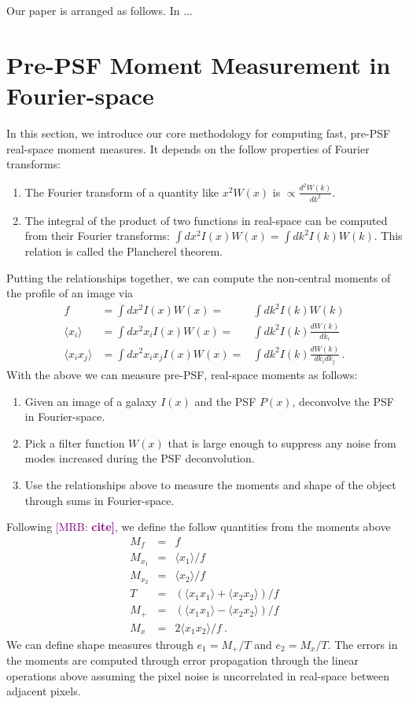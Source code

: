 \documentclass[twocolappendix, appendixfloats, numberedappendix, twocolumn, apj]{openjournal}
\newcommand{\mrb}[1]{\textcolor{purple}{[MRB: \bf #1]}\xspace}
\begin{document}
Our paper is arranged as follows. In ...

\section{Pre-PSF Moment Measurement in Fourier-space}

In this section, we introduce our core methodology for computing fast, pre-PSF real-space moment
measures. It depends on the follow properties of Fourier transforms:
\begin{enumerate}
\item The Fourier transform of a quantity like $x^2W(x)$ is $\propto\frac{d^{2}W(k)}{dk^2}$.
\item The integral of the product of two functions in real-space can be computed from their Fourier
      transforms: $\int dx^2 I(x)W(x) = \int dk^2 I(k)W(k)$. This relation is called the Plancherel theorem.
\end{enumerate}
Putting the relationships together, we can compute the non-central moments of the profile of
an image via
\begin{eqnarray}
f                          & = \int dx^2 I(x)W(x) =            & \int dk^2 I(k)W(k) \\
\langle x_{i} \rangle      & = \int dx^2 x_{i} I(x)W(x) =      & \int dk^2 I(k)\frac{dW(k)}{dk_i} \\
\langle x_{i}x_{j} \rangle & = \int dx^2 x_{i}x_{j} I(x)W(x) = & \int dk^2 I(k)\frac{dW(k)}{dk_{i}dk_{j}}\,.
\end{eqnarray}
With the above we can measure pre-PSF, real-space moments as follows:
\begin{enumerate}
\item Given an image of a galaxy $I(x)$ and the PSF $P(x)$, deconvolve the PSF in Fourier-space.
\item Pick a filter function $W(x)$ that is large enough to suppress any noise from modes increased
      during the PSF deconvolution.
\item Use the relationships above to measure the moments and shape of the object through sums in Fourier-space.
\end{enumerate}
Following \mrb{cite}, we define the follow quantities from the moments above
\begin{eqnarray}
M_{f} & = & f \nonumber \\
M_{x_1} & = & \langle x_{1} \rangle/f \nonumber \\
M_{x_2} & = & \langle x_{2} \rangle/f \nonumber \\
T & = & (\langle x_{1}x_{1} \rangle + \langle x_{2}x_{2} \rangle)/f \nonumber \\
M_{+} & = & (\langle x_{1}x_{1} \rangle - \langle x_{2}x_{2} \rangle)/f \nonumber \\
M_{x} & = & 2 \langle x_{1}x_{2} \rangle/f\ . \nonumber
\end{eqnarray}
We can define shape measures through $e_1 = M_{+}/T$ and $e_2 = M_{x}/T$. The errors in the
moments are computed through error propagation through the linear operations above assuming
the pixel noise is uncorrelated in real-space between adjacent pixels.
\end{document}
